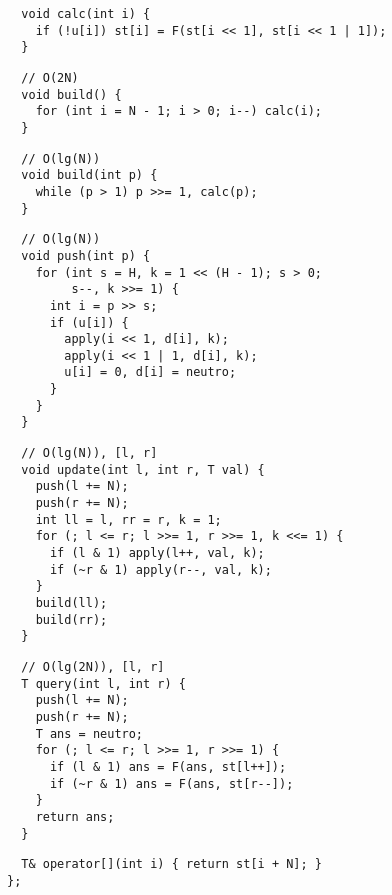 \documentclass[twoside]{article}
\begin{document}
\begin{multicols*}{2}
\begin{verbatim}
  void calc(int i) {
    if (!u[i]) st[i] = F(st[i << 1], st[i << 1 | 1]);
  }
\end{verbatim}
\vspace{-12pt}
\begin{verbatim}
  // O(2N)
  void build() {
    for (int i = N - 1; i > 0; i--) calc(i);
  }
\end{verbatim}
\vspace{-12pt}
\begin{verbatim}
  // O(lg(N))
  void build(int p) {
    while (p > 1) p >>= 1, calc(p);
  }
\end{verbatim}
\vspace{-12pt}
\begin{verbatim}
  // O(lg(N))
  void push(int p) {
    for (int s = H, k = 1 << (H - 1); s > 0;
         s--, k >>= 1) {
      int i = p >> s;
      if (u[i]) {
        apply(i << 1, d[i], k);
        apply(i << 1 | 1, d[i], k);
        u[i] = 0, d[i] = neutro;
      }
    }
  }
\end{verbatim}
\vspace{-12pt}
\begin{verbatim}
  // O(lg(N)), [l, r]
  void update(int l, int r, T val) {
    push(l += N);
    push(r += N);
    int ll = l, rr = r, k = 1;
    for (; l <= r; l >>= 1, r >>= 1, k <<= 1) {
      if (l & 1) apply(l++, val, k);
      if (~r & 1) apply(r--, val, k);
    }
    build(ll);
    build(rr);
  }
\end{verbatim}
\vspace{-12pt}
\begin{verbatim}
  // O(lg(2N)), [l, r]
  T query(int l, int r) {
    push(l += N);
    push(r += N);
    T ans = neutro;
    for (; l <= r; l >>= 1, r >>= 1) {
      if (l & 1) ans = F(ans, st[l++]);
      if (~r & 1) ans = F(ans, st[r--]);
    }
    return ans;
  }
\end{verbatim}
\vspace{-12pt}
\begin{verbatim}
  T& operator[](int i) { return st[i + N]; }
};
\end{verbatim}

\subsubsectionfont{\large\bfseries\sffamily\underline}

\end{multicols*}
\end{document}
